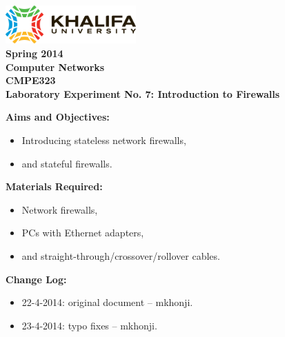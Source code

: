 \documentclass[pdftex,12pt,a4paper]{article}
\begin{document}
    \begin{titlepage}
        \begin{center}
            \includegraphics[width=5cm]{figures/kulogo}\\[1cm]
            {\Large \bfseries
                Spring 2014\\
                Computer Networks\\
                CMPE323\\[1cm]
            }
            {\large \bfseries
                \noindent Laboratory Experiment No. 7: Introduction to Firewalls\\[1cm]
            }
        \end{center}

        \noindent \textbf{Aims and Objectives:}
            \begin{itemize}[leftmargin=4cm]
                \item Introducing stateless network firewalls,
                \item and stateful firewalls.
            \end{itemize}
            \vspace{0.5cm}

        \noindent \textbf{Materials Required:}
            \begin{itemize}[leftmargin=4cm]
                \item Network firewalls,
                \item PCs with Ethernet adapters,
                \item and straight-through/crossover/rollover cables.
            \end{itemize}
            \vspace{0.5cm}

        \noindent \textbf{Change Log:}
            \begin{itemize}[leftmargin=4cm]
                \item 22-4-2014: original document -- mkhonji.
                \item 23-4-2014: typo fixes  -- mkhonji.
            \end{itemize}
    \end{titlepage}
    \newpage

\end{document}
